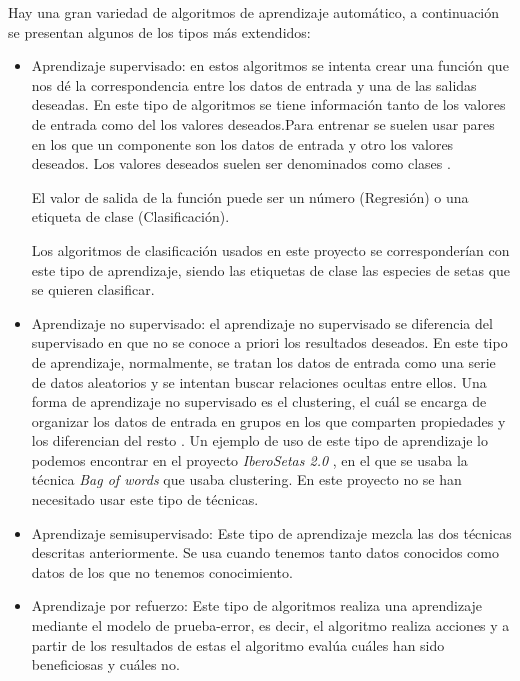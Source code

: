 Hay una gran variedad de algoritmos de aprendizaje automático, a continuación se presentan algunos de los tipos más extendidos:
\begin{itemize}

	\item{Aprendizaje supervisado}: en estos algoritmos se intenta crear una función que nos dé la correspondencia entre los datos de entrada y una de las salidas deseadas. En este tipo de algoritmos se tiene información tanto de los valores de entrada como del los valores deseados.Para entrenar se suelen usar pares en los que un componente son los datos de entrada y otro los valores deseados. Los valores deseados suelen ser denominados como clases \cite{wiki:aprendizaheSupervisado}.
	
	El valor de salida de la función puede ser un número (Regresión) o una etiqueta de clase (Clasificación).
	
	Los algoritmos de clasificación usados en este proyecto se corresponderían con este tipo de aprendizaje, siendo las etiquetas de clase las especies de setas que se quieren clasificar.
	
	\item{Aprendizaje no supervisado}: el aprendizaje no supervisado se diferencia del supervisado en que no se conoce a priori los resultados deseados. En este tipo de aprendizaje, normalmente, se tratan los datos de entrada como una serie de datos aleatorios y se intentan buscar relaciones ocultas entre ellos.
	Una forma de aprendizaje no supervisado es el clustering, el cuál se encarga de organizar los datos de entrada en grupos en los que comparten propiedades y los diferencian del resto \cite{wiki:aprendizajeNoSupervisado}.
	Un ejemplo de uso de este tipo de aprendizaje lo podemos encontrar en el proyecto \textit{IberoSetas 2.0} \cite{iberosetas}, en el que se usaba la técnica \textit{Bag of words} que usaba clustering. En este proyecto no se han necesitado usar este tipo de técnicas.
	
	\item{Aprendizaje semisupervisado}: Este tipo de aprendizaje mezcla las dos técnicas descritas anteriormente. Se usa cuando tenemos tanto datos conocidos como datos de los que no tenemos conocimiento.
	
	\item{Aprendizaje por refuerzo}: Este tipo de algoritmos realiza una aprendizaje mediante el modelo de prueba-error, es decir, el algoritmo realiza acciones y a partir de los resultados de estas el algoritmo evalúa cuáles han sido beneficiosas y cuáles no.
\end{itemize}
	
